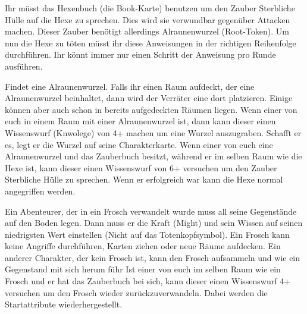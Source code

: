 






Ihr müsst das Hexenbuch (die Book-Karte) benutzen um den Zauber Sterbliche Hülle auf die Hexe zu sprechen. Dies wird sie verwundbar gegenüber Attacken machen. Dieser Zauber benötigt allerdings Alraunenwurzel (Root-Token).
Um nun die Hexe zu töten müsst ihr diese Anweisungen in der richtigen Reihenfolge durchführen. Ihr könnt immer nur einen Schritt der Anweisung pro Runde ausführen.

  \begin{itemize}
        \bitem Findet eine Alraunenwurzel. Falls ihr einen Raum aufdeckt, der eine Alraunenwurzel
beinhaltet, dann wird der Verräter eine dort platzieren. Einige können aber auch schon
in bereits aufgedeckten Räumen liegen.
        \bitem Wenn einer von euch in einem Raum mit einer Alraunenwurzel ist, dann kann dieser einen Wissenswurf (Knwolege) von 4+ machen um eine Wurzel auszugraben. Schafft
er es, legt er die Wurzel auf seine Charakterkarte.
        \bitem Wenn einer von euch eine Alraunenwurzel und das Zauberbuch besitzt, während er im
selben Raum wie die Hexe ist, kann dieser einen Wissenswurf von 6+ versuchen um den Zauber Sterbliche Hülle zu sprechen. Wenn er erfolgreich war kann die Hexe normal angegriffen werden.
    \end{itemize}


  \begin{itemize}
        \bitem Ein Abenteurer, der in ein Frosch verwandelt wurde muss all seine Gegenstände auf den Boden legen. Dann muss er die Kraft (Might) und sein Wissen auf seinen niedrigsten Wert einstellen (Nicht auf das Totenkopfsymbol). Ein Frosch kann keine Angriffe durchführen, Karten ziehen oder neue Räume aufdecken. Ein anderer Charakter, der kein Frosch ist, kann den Frosch aufsammeln und wie ein Gegenstand mit sich herum führ
        \bitem Ist einer von euch im selben Raum wie ein Frosch und er hat das Zauberbuch bei sich, kann dieser einen Wissenswurf 4+ versuchen um den Frosch wieder zurückzuverwandeln. Dabei werden die Startattribute wiederhergestellt.
    \end{itemize}

